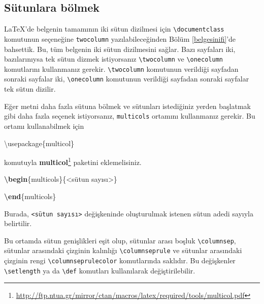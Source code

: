 \documentclass[
  10pt,
]{scrbook}
\newenvironment{Shaded}{\begin{snugshade}}{\end{snugshade}}
\newcommand{\BuiltInTok}[1]{#1}
\newcommand{\ExtensionTok}[1]{#1}
\newcommand{\KeywordTok}[1]{\textcolor[rgb]{0.13,0.29,0.53}{\textbf{#1}}}
\newcommand{\NormalTok}[1]{#1}
\renewcommand{\href}[2]{#2\footnote{\url{#1}}}
\theoremstyle{definition}
\theoremstyle{definition}
\theoremstyle{definition}
\theoremstyle{definition}
\theoremstyle{remark}
\begin{document}
\hypertarget{suxfctunlara-buxf6lmek}{%
\subsection{Sütunlara bölmek}\label{suxfctunlara-buxf6lmek}}

LaTeX'de belgenin tamamının iki sütun dizilmesi için \texttt{\textbackslash{}documentclass} komutunun seçeneğine \texttt{twocolumn} yazılabileceğinden Bölüm \ref{belgesinifi}'de bahsettik. Bu, tüm belgenin iki sütun dizilmesini sağlar. Bazı sayfaları iki, bazılarınıysa tek sütun dizmek istiyorsanız \texttt{\textbackslash{}twocolumn} ve \texttt{\textbackslash{}onecolumn} komutlarını kullanmanız gerekir. \texttt{\textbackslash{}twocolumn} komutunun verildiği sayfadan sonraki sayfalar iki, \texttt{\textbackslash{}onecolumn} komutunun verildiği sayfadan sonraki sayfalar tek sütun dizilir.

Eğer metni daha fazla sütuna bölmek ve sütunları istediğiniz yerden başlatmak gibi daha fazla seçenek istiyorsanız, \texttt{multicols} ortamını kullanmanız gerekir. Bu ortamı kullanabilmek için

\begin{Shaded}
\begin{Highlighting}[]
\BuiltInTok{\textbackslash{}usepackage}\NormalTok{\{}\ExtensionTok{multicol}\NormalTok{\}}
\end{Highlighting}
\end{Shaded}

komutuyla \href{http://ftp.ntua.gr/mirror/ctan/macros/latex/required/tools/multicol.pdf}{\textbf{multicol}} paketini eklemelisiniz.

\begin{Shaded}
\begin{Highlighting}[]
\KeywordTok{\textbackslash{}begin}\NormalTok{\{}\ExtensionTok{multicols}\NormalTok{\}\{\textless{}sütun sayısı\textgreater{}\}}

\KeywordTok{\textbackslash{}end}\NormalTok{\{}\ExtensionTok{multicols}\NormalTok{\}}
\end{Highlighting}
\end{Shaded}

Burada, \texttt{\textless{}sütun\ sayısı\textgreater{}} değişkeninde oluşturulmak istenen sütun adedi sayıyla belirtilir.

Bu ortamda sütun genişlikleri eşit olup, sütunlar arası boşluk \texttt{\textbackslash{}columnsep}, sütunlar arasındaki çizginin kalınlığı \texttt{\textbackslash{}columnseprule} ve sütunlar arasındaki çizginin rengi \texttt{\textbackslash{}columnseprulecolor} komutlarında saklıdır. Bu değişkenler \texttt{\textbackslash{}setlength} ya da \texttt{\textbackslash{}def} komutları kullanılarak değiştirilebilir.
\end{document}
